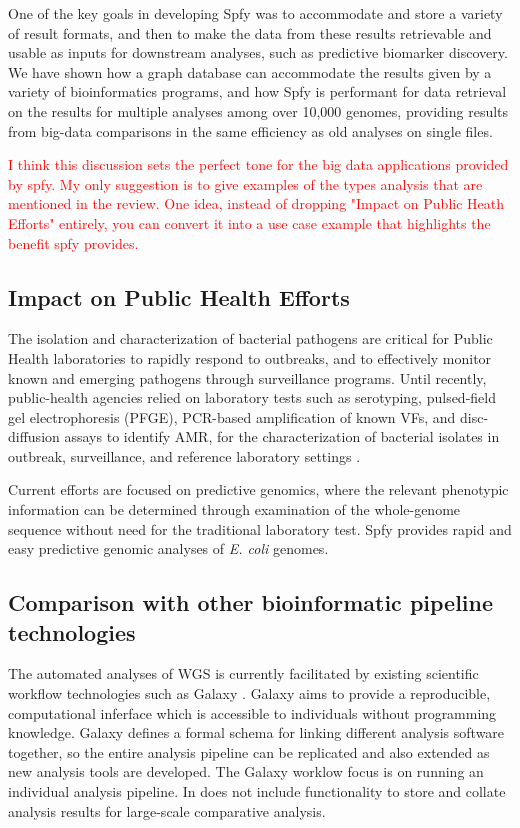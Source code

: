 \documentclass{article}
\newcommand\mwcomment[1]{\textcolor{red}{#1}}
\begin{document}
One of the key goals in developing Spfy was to accommodate and store a variety of result formats, and then to make the data from these results retrievable and usable as inputs for downstream analyses, such as predictive biomarker discovery. We have shown how a graph database can accommodate the results given by a variety of bioinformatics programs, and how Spfy is performant for data retrieval on the results for multiple analyses among over 10,000 genomes, providing results from big-data comparisons in the same efficiency as old analyses on single files.

\mwcomment{I think this discussion sets the perfect tone for the big data applications provided by spfy. My only suggestion is to give examples of the types analysis that are mentioned in the review. One idea, instead of dropping "Impact on Public Heath Efforts" entirely, you can convert it into a use case example that highlights the benefit spfy provides.}

\subsection{Impact on Public Health Efforts}

The isolation and characterization of bacterial pathogens are critical for Public Health laboratories to rapidly respond to outbreaks, and to effectively monitor known and emerging pathogens through surveillance programs.
Until recently, public-health agencies relied on laboratory tests such as serotyping, pulsed-field gel electrophoresis (PFGE), PCR-based amplification of known VFs, and disc-diffusion assays to identify AMR, for the characterization of bacterial isolates in outbreak, surveillance, and reference laboratory settings \cite{ronholm2016navigating}.

Current efforts are focused on predictive genomics, where the relevant phenotypic information can be determined through examination of the whole-genome sequence without need for the traditional laboratory test. Spfy provides rapid and easy predictive genomic analyses of \textit{E. coli} genomes.

\subsection{Comparison with other bioinformatic pipeline technologies}


The automated analyses of WGS is currently facilitated by existing scientific workflow technologies such as Galaxy \cite{goecks2010galaxy}. Galaxy aims to provide a reproducible, computational inferface which is accessible to individuals without programming knowledge. Galaxy defines a formal schema for linking different analysis software together, so the entire analysis pipeline can be replicated and also extended as new analysis tools are developed. The Galaxy worklow focus is on running an individual analysis pipeline. In does not include functionality to store and collate analysis results for large-scale comparative analysis.
\end{document}
